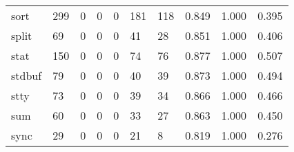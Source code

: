 \begin{longtable}{lp{2.0cm}p{2.0cm}p{2.0cm}p{2.0cm}p{2.0cm}p{2.0cm}p{2.0cm}p{2.0cm}p{2.0cm}}
sort      &                    299 &                                             0 &                                            0 &                                           0 &                                          181 &                                        118 &                                0.849 &                                  1.000 &                                0.395 \\
split     &                     69 &                                             0 &                                            0 &                                           0 &                                           41 &                                         28 &                                0.851 &                                  1.000 &                                0.406 \\
stat      &                    150 &                                             0 &                                            0 &                                           0 &                                           74 &                                         76 &                                0.877 &                                  1.000 &                                0.507 \\
stdbuf    &                     79 &                                             0 &                                            0 &                                           0 &                                           40 &                                         39 &                                0.873 &                                  1.000 &                                0.494 \\
stty      &                     73 &                                             0 &                                            0 &                                           0 &                                           39 &                                         34 &                                0.866 &                                  1.000 &                                0.466 \\
sum       &                     60 &                                             0 &                                            0 &                                           0 &                                           33 &                                         27 &                                0.863 &                                  1.000 &                                0.450 \\
sync      &                     29 &                                             0 &                                            0 &                                           0 &                                           21 &                                          8 &                                0.819 &                                  1.000 &                                0.276 \\

\end{longtable}
